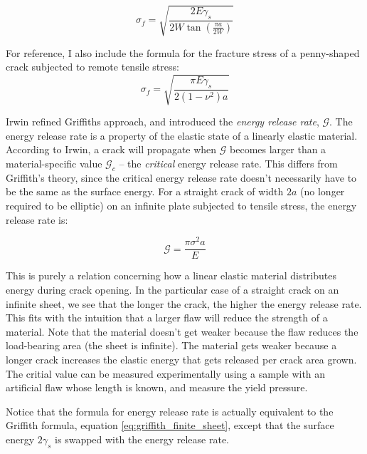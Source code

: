  \begin{equation}
 	\sigma_f = \sqrt{\frac{2E\gamma_s}{2W\tan\left( \frac{\pi a}{2W}\right)}}
 	\label{eq:griffith_finite_sheet}
 \end{equation}

For reference, I also include the formula for the fracture stress of a penny-shaped crack subjected to remote tensile stress:
\begin{equation}
	\sigma_f = \sqrt{\frac{\pi E \gamma_s }{2(1-\nu^2)a}}
\end{equation}
 

 Irwin refined Griffiths approach, and introduced the \emph{energy release rate}, $\mathcal{G}$. The energy release rate is a property of the elastic state of a linearly elastic material. According to Irwin, a crack will propagate when $\mathcal{G}$ becomes larger than a material-specific value $\mathcal{G}_c$ -- the \emph{critical} energy release rate. This differs from Griffith's theory, since the critical energy release rate doesn't necessarily have to be the same as the surface energy. For a straight crack of width $2a$ (no longer required to be elliptic) on an infinite plate subjected to tensile stress, the energy release rate is:

\begin{equation}
	\mathcal{G} = \frac{\pi \sigma^2 a}{E}
\end{equation}

This is purely a relation concerning how a linear elastic material distributes energy during crack opening. In the particular case of a straight crack on an infinite sheet, we see that the longer the crack, the higher the energy release rate. This fits with the intuition that a larger flaw will reduce the strength of a material. Note that the material doesn't get weaker because the flaw reduces the load-bearing area (the sheet is infinite). The material gets weaker because a longer crack increases the elastic energy that gets released per crack area grown. The critial value can be measured experimentally using a sample with an artificial flaw whose length is known, and measure the yield pressure. 

Notice that the formula for energy release rate is actually equivalent to the Griffith formula, equation \ref{eq:griffith_finite_sheet}, except that the surface energy $2\gamma_s$ is swapped with the energy release rate.

